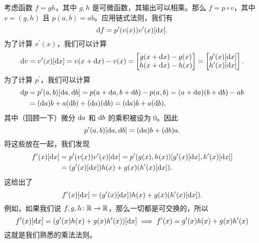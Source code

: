 \documentclass[../../book-main_zh.tex]{subfiles}
\begin{document}
\begin{example}
    考虑函数 \(f = gh\)，其中 \(g, h\) 是可微函数，其输出可以相乘。那么 \(f = p \circ v\)，其中 \(v = (g, h)\) 且 \(p(a, b) = ab\)。应用链式法则，我们有
    \begin{equation}
        \mathrm{d}f = p^{\prime}(v(x))v^{\prime}(x)[\mathrm{d}x].
    \end{equation}
    为了计算 \(v^{\prime}(x)\)，我们可以计算
    \begin{equation}
        \mathrm{d}v = v^{\prime}(x)[\mathrm{d}x] = v(x + \mathrm{d}x) - v(x) = \begin{bmatrix}g(x + \mathrm{d}x) - g(x) \\ h(x + \mathrm{d}x) - h(x)\end{bmatrix} = \begin{bmatrix}g^{\prime}(x)[\mathrm{d}x] \\ h^{\prime}(x)[\mathrm{d}x]\end{bmatrix}.
    \end{equation}
    为了计算 \(p^{\prime}\)，我们可以计算
    \begin{align}
        \mathrm{d}p 
        &= p^{\prime}(a, b)[\mathrm{d}a, \mathrm{d}b] = p(a + \mathrm{d}a, b + \mathrm{d}b) - p(a, b) = (a + \mathrm{d}a)(b + \mathrm{d}b) - ab \\
        &= (\mathrm{d}a)b + a(\mathrm{d}b) + (\mathrm{d}a)(\mathrm{d}b) = (\mathrm{d}a)b + a(\mathrm{d}b),
    \end{align}
    其中（回顾一下）微分 \(\mathrm{d}a\) 和 \(\mathrm{d}b\) 的乘积被设为 \(0\)。因此
    \begin{equation}
        p^{\prime}(a, b)[\mathrm{d}a, \mathrm{d}b] = (\mathrm{d}a)b + (\mathrm{d}b)a.
    \end{equation}
    将这些放在一起，我们发现
    \begin{align}
        f^{\prime}(x)[\mathrm{d}x] 
        &= p^{\prime}(v(x))v^{\prime}(x)[\mathrm{d}x] = p^{\prime}(g(x), h(x))[g^{\prime}(x)[\mathrm{d}x], h^{\prime}(x)[\mathrm{d}x]] \\
        &= (g^{\prime}(x)[\mathrm{d}x])h(x) + g(x)(h^{\prime}(x)[\mathrm{d}x]).
    \end{align}
    这给出了
    \begin{equation}
        f^{\prime}(x)[\mathrm{d}x] = (g^{\prime}(x)[\mathrm{d}x])h(x) + g(x)(h^{\prime}(x)[\mathrm{d}x]).
    \end{equation}
    例如，如果我们说 \(f, g, h \colon \mathbb{R} \to \mathbb{R}\)，那么一切都是可交换的，所以
    \begin{equation}
        f^{\prime}(x)[\mathrm{d}x] = (g^{\prime}(x)h(x) + g(x)h^{\prime}(x))[\mathrm{d}x] \implies f^{\prime}(x) = g^{\prime}(x)h(x) + g(x)h^{\prime}(x)
    \end{equation}
    这就是我们熟悉的乘法法则。
\end{example}
\end{document}
